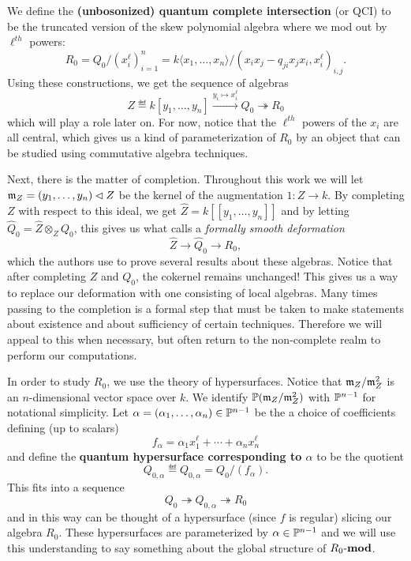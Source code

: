 \documentclass [11pt, proquest] {uwthesis}[2020/02/24]
\begin{document}
    We define the \textbf{(unbosonized) quantum complete intersection} (or QCI) to be the truncated version of the skew polynomial algebra where we mod out by $\ell^{th}$ powers:
    \[R_0 = Q_0/(x_i^\ell)_{i=1}^n=k\langle x_1,\dots,x_n\rangle/(x_ix_j-q_{ji}x_jx_i, x_i^\ell)_{i,j}.\]
    Using these constructions, we get the sequence of algebras
    \[Z\eqdef k[y_1,\dots,y_n]\xrightarrow{y_i\mapsto x_i^\ell} Q_0\twoheadrightarrow R_0\]
    which will play a role later on. For now, notice that the $\ell^{th}$ powers of the $x_i$ are all central, which gives us a kind of parameterization of $R_0$ by an object that can be studied using commutative algebra techniques.
    
    Next, there is the matter of completion. Throughout this work we will let $\mathfrak{m}_Z=(y_1,\dots,y_n)\lhd Z$ be the kernel of the augmentation $1:Z\to k$. By completing $Z$ with respect to this ideal, we get $\widehat Z=k[[y_1,\dots,y_n]]$ and by letting $\widehat Q_0=\widehat Z\otimes_Z Q_0$, this gives us what \cite{negron-pevtsovaII} calls a \textit{formally smooth deformation}
    \[\widehat Z\to \widehat Q_0\to R_0,\label{eq:formally-smooth-deformation} \tag{FSD}\]
    which the authors use to prove several results about these algebras. Notice that after completing $Z$ and $Q_0$, the cokernel remains unchanged! This gives us a way to replace our deformation with one consisting of local algebras. Many times passing to the completion is a formal step that must be taken to make statements about existence and about sufficiency of certain techniques. Therefore we will appeal to this when necessary, but often return to the non-complete realm to perform our computations.
    
    In order to study $R_0$, we use the theory of hypersurfaces. Notice that $\mathfrak{m}_Z/\mathfrak{m}_Z^2$ is an $n$-dimensional vector space over $k$. We identify $\mathbb{P}(\mathfrak{m}_Z/\mathfrak{m}_Z^2)$ with $\mathbb{P}^{n-1}$ for notational simplicity. Let $\alpha=(\alpha_1,\dots,\alpha_n)\in \mathbb{P}^{n-1}$ be the a choice of coefficients defining (up to scalars)
    \[f_\alpha = \alpha_1x_1^\ell+\cdots+\alpha_nx_n^\ell\]
    and define the \textbf{quantum hypersurface corresponding to $\alpha$} to be the quotient
    \[Q_{0,\alpha}\eqdef Q_{0,\alpha}=Q_0/(f_\alpha).\]
    This fits into a sequence
    \[
        Q_0\twoheadrightarrow Q_{0,\alpha} \twoheadrightarrow R_0\label{eq:hypersurface} \tag{HS}
    \]
    and in this way can be thought of a hypersurface (since $f$ is regular) slicing our algebra $R_0$. These hypersurfaces are parameterized by $\alpha\in\mathbb{P}^{n-1}$ and we will use this understanding to say something about the global structure of $R_0\text{-}\mathbf{mod}$.
    
\end{document}
